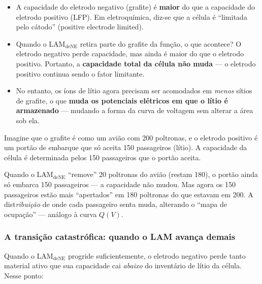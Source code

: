 \documentclass[12pt,a4paper]{article}
\begin{document}
\begin{itemize}
  \item A capacidade do eletrodo negativo (grafite) \'{e} \textbf{maior} do que
    a capacidade do eletrodo positivo (LFP). Em eletroqu\'{i}mica, diz-se que a
    c\'{e}lula \'{e} ``limitada pelo c\'{a}todo'' (positive electrode limited).
  \item Quando o LAM$_\text{deNE}$ retira parte do grafite da fun\c{c}\~ao, o que
    acontece? O eletrodo negativo perde capacidade, mas ainda \'{e} maior do
    que o eletrodo positivo. Portanto, a \textbf{capacidade total da c\'{e}lula
    n\~ao muda} --- o eletrodo positivo continua sendo o fator limitante.
  \item No entanto, os \'{i}ons de l\'{i}tio agora precisam ser acomodados em
    \textit{menos} s\'{i}tios de grafite, o que \textbf{muda os potenciais
    el\'{e}tricos em que o l\'{i}tio \'{e} armazenado} --- mudando a forma da
    curva de voltagem sem alterar a \'{a}rea sob ela.
\end{itemize}

\begin{destaque}
Imagine que o grafite \'{e} como um avi\~ao com 200 poltronas, e o eletrodo positivo
\'{e} um port\~ao de embarque que s\'{o} aceita 150 passageiros (l\'{i}tio). A capacidade
da c\'{e}lula \'{e} determinada pelos 150 passageiros que o port\~ao aceita.

Quando o LAM$_\text{deNE}$ ``remove'' 20 poltronas do avi\~ao (restam 180),
o port\~ao ainda s\'{o} embarca 150 passageiros --- a capacidade n\~ao mudou.
Mas agora os 150 passageiros est\~ao mais ``apertados'' em 180 poltronas do
que estavam em 200. A dist\textit{ribui\c{c}\~ao} de onde cada passageiro
senta muda, alterando o ``mapa de ocupa\c{c}\~ao'' --- an\'{a}logo \`{a} curva $Q(V)$.
\end{destaque}

\subsubsection{A transi\c{c}\~ao catastr\'{o}fica: quando o LAM avan\c{c}a demais}

Quando o LAM$_\text{deNE}$ progride suficientemente, o eletrodo negativo perde
tanto material ativo que sua capacidade cai \textit{abaixo} do invent\'{a}rio de
l\'{i}tio da c\'{e}lula. Nesse ponto:
\end{document}
